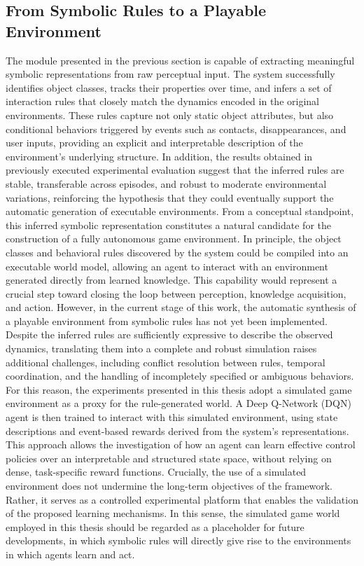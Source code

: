 \documentclass[12pt,a4paper]{report}
\begin{document}
\subsection{From Symbolic Rules to a Playable Environment}
The module presented in the previous section is capable of extracting meaningful symbolic representations from raw perceptual input. The system successfully identifies object classes, tracks their properties over time, and infers a set of interaction rules that closely match the dynamics encoded in the original environments. These rules capture not only static object attributes, but also conditional behaviors triggered by events such as contacts, disappearances, and user inputs, providing an explicit and interpretable description of the environment's underlying structure. In addition, the results obtained in previously executed experimental evaluation suggest that the inferred rules are stable, transferable across episodes, and robust to moderate environmental variations, reinforcing the hypothesis that they could eventually support the automatic generation of executable environments.
From a conceptual standpoint, this inferred symbolic representation constitutes a natural candidate for the construction of a fully autonomous game environment. In principle, the object classes and behavioral rules discovered by the system could be compiled into an executable world model, allowing an agent to interact with an environment generated directly from learned knowledge. This capability would represent a crucial step toward closing the loop between perception, knowledge acquisition, and action.
However, in the current stage of this work, the automatic synthesis of a playable environment from symbolic rules has not yet been implemented. Despite the inferred rules are sufficiently expressive to describe the observed dynamics, translating them into a complete and robust simulation raises additional challenges, including conflict resolution between rules, temporal coordination, and the handling of incompletely specified or ambiguous behaviors. For this reason, the experiments presented in this thesis adopt a simulated game environment as a proxy for the rule-generated world.
A Deep Q-Network (DQN) agent is then trained to interact with this simulated environment, using state descriptions and event-based rewards derived from the system's representations. This approach allows the investigation of how an agent can learn effective control policies over an interpretable and structured state space, without relying on dense, task-specific reward functions.
Crucially, the use of a simulated environment does not undermine the long-term objectives of the framework. Rather, it serves as a controlled experimental platform that enables the validation of the proposed learning mechanisms. In this sense, the simulated game world employed in this thesis should be regarded as a placeholder for future developments, in which symbolic rules will directly give rise to the environments in which agents learn and act.
\end{document}
